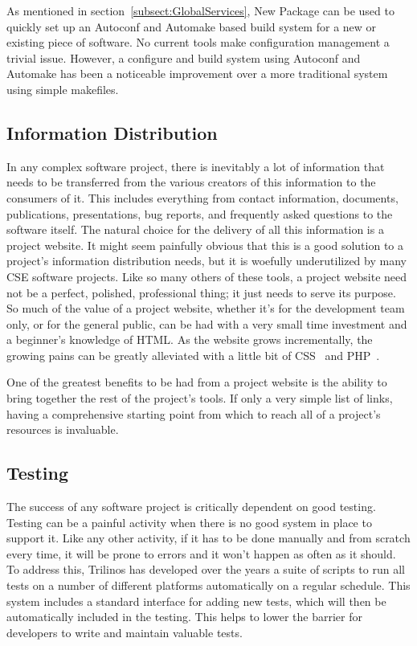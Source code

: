 \documentclass[12pt,relax]{article}
\begin{document}
As mentioned in section~\ref{subsect:GlobalServices}, New Package can be used 
to quickly set up an Autoconf and Automake based build system for a new or 
existing piece of software.  No current tools make configuration management 
a trivial issue.  However, a
configure and build system using Autoconf and Automake has been a
noticeable improvement over a more traditional system using simple makefiles.

\subsection{Information Distribution}


In any complex software project, there is inevitably a lot of information that
needs to be transferred from the various creators of this information to the
consumers of it.  This includes everything from contact information,
documents, publications, presentations, bug reports, and frequently asked
questions to the software itself.  The natural choice for the delivery of all
this information is a project website.  It might seem painfully obvious that
this is a good solution to a project's information distribution needs, but it
is woefully underutilized by many CSE software projects.  Like so many others
of these tools, a project website need not be a perfect, polished, professional
thing; it just needs to serve its purpose.  So much of the value of a project
website, whether it's for the development team only, or for the general
public, can be had with a very small time investment and a beginner's
knowledge of HTML.  As the website grows incrementally, the growing pains can
be greatly alleviated with a little bit of CSS~\cite{CSS} and PHP~\cite{PHP}.

One of the greatest benefits to be had from a project website is the ability to
bring together the rest of the project's tools.  If only a very simple list of
links, having a comprehensive starting point from which to reach all of a
project's resources is invaluable.

\subsection{Testing}


The success of any software project is critically dependent on good testing.
Testing can be a painful activity when there is no good system in place to
support it.  Like any other activity, if it has to be done manually and from
scratch every time, it will be prone to errors and it won't happen as often as
it should.  To address this, Trilinos has developed over the years a suite of
scripts to run all tests on a number of different platforms automatically on a
regular schedule.  This system includes a standard interface for adding new
tests, which will then be automatically included in the testing.  This helps
to lower the barrier for developers to write and maintain valuable tests.
\end{document}
